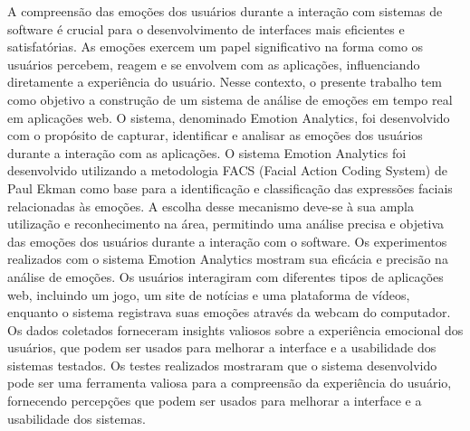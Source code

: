 \begin{resumo-portugues}
  
  A compreensão das emoções dos usuários durante a interação com sistemas de software é crucial para o desenvolvimento de interfaces mais eficientes e satisfatórias. As emoções exercem um papel significativo na forma como os usuários percebem, reagem e se envolvem com as aplicações, influenciando diretamente a experiência do usuário. Nesse contexto, o presente trabalho tem como objetivo a construção de um sistema de análise de emoções em tempo real em aplicações web. O sistema, denominado Emotion Analytics, foi desenvolvido com o propósito de capturar, identificar e analisar as emoções dos usuários durante a interação com as aplicações. O sistema Emotion Analytics foi desenvolvido utilizando a metodologia FACS (Facial Action Coding System) de Paul Ekman como base para a identificação e classificação das expressões faciais relacionadas às emoções. A escolha desse mecanismo deve-se à sua ampla utilização e reconhecimento na área, permitindo uma análise precisa e objetiva das emoções dos usuários durante a interação com o software. Os experimentos realizados com o sistema Emotion Analytics mostram sua eficácia e precisão na análise de emoções. Os usuários interagiram com diferentes tipos de aplicações web, incluindo um jogo, um site de notícias e uma plataforma de vídeos, enquanto o sistema registrava suas emoções através da webcam do computador. Os dados coletados forneceram insights valiosos sobre a experiência emocional dos usuários, que podem ser usados para melhorar a interface e a usabilidade dos sistemas testados. Os testes realizados mostraram que o sistema desenvolvido pode ser uma ferramenta valiosa para a compreensão da experiência do usuário, fornecendo percepções que podem ser usados para melhorar a interface e a usabilidade dos sistemas.


\end{resumo-portugues}
